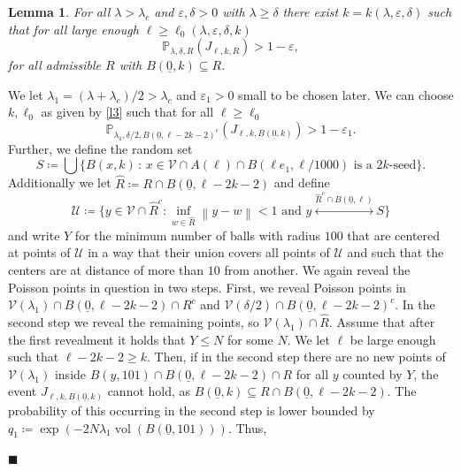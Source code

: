 \documentclass[11pt]{article}%
\newenvironment{proof}{\vspace{1ex}\noindent{\bf Proof.}}{\hspace*{\fill}$\blacksquare$\vspace{1ex}}
\newtheorem{lemma}[lemma]{Lemma}
\newcommand{\norm}[1]{\ensuremath{\left\|#1\right\|}}
\newcommand{\eps}{\varepsilon}
\DeclareMathOperator{\vol}{vol}
\newcommand{\Pro}{\mathbb{P}}
\newcommand{\typ}{\underline{0}}
\begin{document}
\begin{lemma}\label{l4}
	For all $ \lambda>\lambda_c $ and $ \eps,\delta>0 $ with $ \lambda\geq \delta $ there exist $ k=k(\lambda,\eps,\delta) $ such that for all large enough $ \ell\geq \ell_0(\lambda,\eps,\delta,k) $
	\begin{equation*}
		\Pro_{\lambda,\delta,R}(J_{\ell,k,R})>1-\eps,
	\end{equation*}
for all admissible $ R $ with $ B(\typ,k) \subseteq R$.
\end{lemma}
\begin{proof}
	We let $ \lambda_1=(\lambda +\lambda_c)/2 >\lambda_c$ and $ \eps_1>0 $ small to be chosen later. We can choose $ k,\ell_0 $ as given by \cref{l3} such that for all $ \ell\geq \ell_0 $
	\begin{equation*}
		\Pro_{\lambda_1,\delta/2,B(\typ,\ell-2k-2)^c}(J_{\ell,k,B(\typ,k)})>1-\eps_1.
	\end{equation*}
Further, we define the random set
\begin{equation*}
	S\coloneqq \bigcup \{B(x,k)\,:\, x\in\mathcal{V}\cap A(\ell)\cap B(\ell e_1,\ell/1000)\text{ is a }2k\text{-seed}\}.
\end{equation*}
Additionally we let $\widehat{R}\coloneqq R\cap B(\typ,\ell-2k-2)$ and define 
\begin{equation*}
\mathcal{U}\coloneqq\bigg\{y\in \mathcal{V}\cap \widehat{R}^c:\inf_{w\in \widehat{R}}\norm{y-w}<1 \text{ and } y\stackrel{\widehat{R}^c\cap B(\typ,\ell)}{\longleftrightarrow} S \bigg\}
\end{equation*}
and write $ Y$ for the minimum number of balls with radius $ 100 $ that are centered at points of $ \mathcal{U} $ in a way that their union covers all points of $ \mathcal{U} $ and such that the centers are at distance of more than $ 10 $ from another. We again reveal the Poisson points in question in two steps. First, we reveal Poisson points in  $\mathcal{V}(\lambda_1) \cap B(\typ,\ell-2k-2)\cap R^c $ and $ \mathcal{V}(\delta/2)\cap B(\typ,\ell-2k-2)^c $. In the second step we reveal the remaining points, so $\mathcal{V}(\lambda_1)\cap \widehat{R} $. Assume that after the first revealment it holds that $ Y\leq N $ for some $ N $. We let $ \ell $ be large enough such that $ \ell-2k-2\geq k $. Then, if in the second step there are no new points of $ \mathcal{V}(\lambda_{1}) $ inside $ B(y,101)\cap B(\typ,\ell-2k-2)\cap R  $ for all $ y$ counted by $ Y $, the event $ J_{\ell,k,B(\typ,k)} $ cannot hold, as $ B(\typ,k)\subseteq R\cap B(\typ,\ell-2k-2) $. The probability of this occurring in the second step is lower bounded by $ q_1\coloneqq \exp(-2N\lambda_1\vol(B(\typ,101))) $. Thus,

\end{proof}
\end{document}
